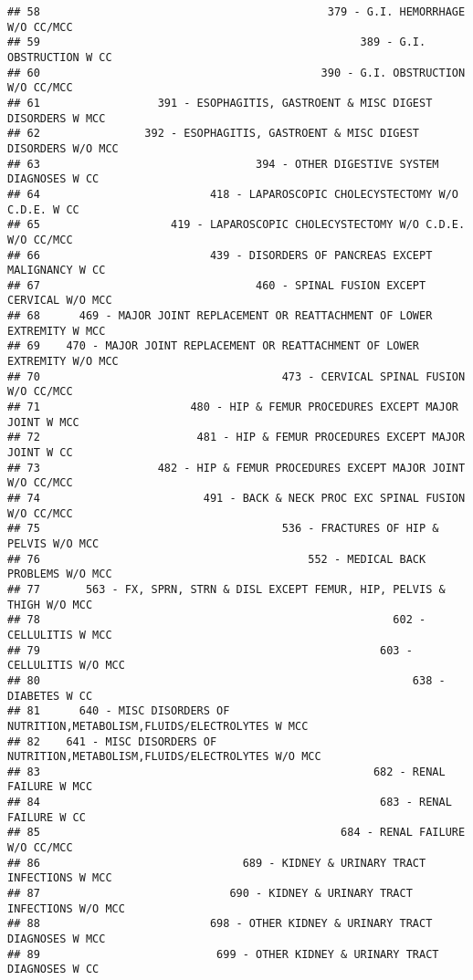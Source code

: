 \documentclass[]{article}
\begin{document}
\begin{verbatim}
## 58                                            379 - G.I. HEMORRHAGE W/O CC/MCC
## 59                                                 389 - G.I. OBSTRUCTION W CC
## 60                                           390 - G.I. OBSTRUCTION W/O CC/MCC
## 61                  391 - ESOPHAGITIS, GASTROENT & MISC DIGEST DISORDERS W MCC
## 62                392 - ESOPHAGITIS, GASTROENT & MISC DIGEST DISORDERS W/O MCC
## 63                                 394 - OTHER DIGESTIVE SYSTEM DIAGNOSES W CC
## 64                          418 - LAPAROSCOPIC CHOLECYSTECTOMY W/O C.D.E. W CC
## 65                    419 - LAPAROSCOPIC CHOLECYSTECTOMY W/O C.D.E. W/O CC/MCC
## 66                          439 - DISORDERS OF PANCREAS EXCEPT MALIGNANCY W CC
## 67                                 460 - SPINAL FUSION EXCEPT CERVICAL W/O MCC
## 68      469 - MAJOR JOINT REPLACEMENT OR REATTACHMENT OF LOWER EXTREMITY W MCC
## 69    470 - MAJOR JOINT REPLACEMENT OR REATTACHMENT OF LOWER EXTREMITY W/O MCC
## 70                                     473 - CERVICAL SPINAL FUSION W/O CC/MCC
## 71                       480 - HIP & FEMUR PROCEDURES EXCEPT MAJOR JOINT W MCC
## 72                        481 - HIP & FEMUR PROCEDURES EXCEPT MAJOR JOINT W CC
## 73                  482 - HIP & FEMUR PROCEDURES EXCEPT MAJOR JOINT W/O CC/MCC
## 74                         491 - BACK & NECK PROC EXC SPINAL FUSION W/O CC/MCC
## 75                                     536 - FRACTURES OF HIP & PELVIS W/O MCC
## 76                                         552 - MEDICAL BACK PROBLEMS W/O MCC
## 77       563 - FX, SPRN, STRN & DISL EXCEPT FEMUR, HIP, PELVIS & THIGH W/O MCC
## 78                                                      602 - CELLULITIS W MCC
## 79                                                    603 - CELLULITIS W/O MCC
## 80                                                         638 - DIABETES W CC
## 81      640 - MISC DISORDERS OF NUTRITION,METABOLISM,FLUIDS/ELECTROLYTES W MCC
## 82    641 - MISC DISORDERS OF NUTRITION,METABOLISM,FLUIDS/ELECTROLYTES W/O MCC
## 83                                                   682 - RENAL FAILURE W MCC
## 84                                                    683 - RENAL FAILURE W CC
## 85                                              684 - RENAL FAILURE W/O CC/MCC
## 86                               689 - KIDNEY & URINARY TRACT INFECTIONS W MCC
## 87                             690 - KIDNEY & URINARY TRACT INFECTIONS W/O MCC
## 88                          698 - OTHER KIDNEY & URINARY TRACT DIAGNOSES W MCC
## 89                           699 - OTHER KIDNEY & URINARY TRACT DIAGNOSES W CC

\end{verbatim}
\end{document}
